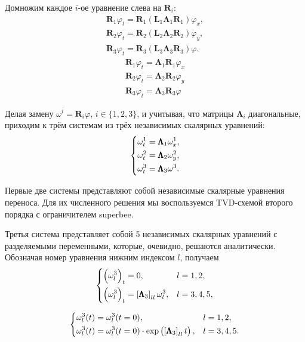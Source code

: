 Домножим каждое $i$-ое уравнение слева на $\pmb{R}_i$:
\begin{gather*} 
    \pmb{R}_1 \varphi_t = \pmb{R}_1\left(\pmb{L}_1 \pmb{\Lambda}_1 \pmb{R}_1\right) \varphi_x , \\
	\pmb{R}_2 \varphi_t = \pmb{R}_2\left(\pmb{L}_2 \pmb{\Lambda}_2 \pmb{R}_2\right) \varphi_y , \\
	\pmb{R}_3 \varphi_t = \pmb{R}_3\left(\pmb{L}_3 \pmb{\Lambda}_3\pmb{ R}_3\right) \varphi .
\end{gather*}
\begin{gather*} 
    \pmb{R}_1 \varphi_t = \pmb{\Lambda}_1 \pmb{R}_1 \varphi_x \\
	\pmb{R}_2 \varphi_t = \pmb{\Lambda}_2 \pmb{R}_2 \varphi_y \\
	\pmb{R}_3 \varphi_t = \pmb{\Lambda}_3 \pmb{R}_3 \varphi
\end{gather*}
    
\noindent Делая замену $\omega^i = \pmb{R}_i\varphi $, $i\in\{1,2,3\}$, и учитывая, что матрицы $\pmb{\Lambda}_i$ диагональные, приходим к трём системам из трёх независимых скалярных уравнений:
\begin{equation}
\begin{dcases}
    \omega^1_t = \pmb{\Lambda}_1 \omega^1_x , \\
	\omega^2_t = \pmb{\Lambda}_2 \omega^2_y , \\
	\omega^3_t = \pmb{\Lambda}_3 \omega^3 .
\end{dcases}
\label{eq:pml_grid_char_sys}
\end{equation}

\noindent Первые две системы представляют собой независимые скалярные уравнения переноса. Для их численного решения мы  воспользуемся TVD-схемой второго порядка с ограничителем superbee.
    
Третья система представляет собой 5 независимых скалярных уравнений с разделяемыми переменными, которые, очевидно, решаются аналитически. Обозначая номер уравнения нижним индексом $l$, получаем
\begin{equation*}
\begin{dcases}
    \left(\omega^3_l\right)_t = 0 , & l=1,2 ,\\
    \left(\omega^3_l\right)_t = \left[\pmb{\Lambda}_3\right]_{ll} \omega^3_l , & l=3,4,5 ,
\end{dcases}
\end{equation*}

\begin{equation*}
\begin{dcases}
    \omega^3_l(t) = \omega^3_l(t=0) , & l=1,2 , \\
    \omega^3_l(t) = \omega^3_l(t=0) \cdot \exp\left(\left[\pmb{\Lambda}_3\right]_{ll} t\right) , & l = 3,4,5 .
\end{dcases}
\end{equation*}

